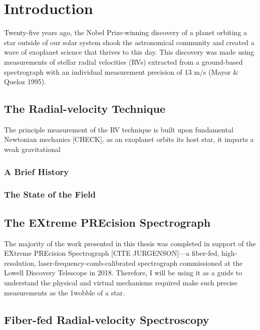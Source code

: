 \chapter{Introduction} \label{intro}

Twenty-five years ago, the Nobel Prize-winning discovery of a planet orbiting a star outside of our solar system shook the astronomical community and created a wave of exoplanet science that thrives to this day. This discovery was made using measurements of stellar radial velocities (RVs) extracted from a ground-based spectrograph with an individual measurement precision of 13 m/s (Mayor \& Queloz 1995). 


\section{The Radial-velocity Technique} \label{intro:eprv}

The principle measurement of the RV technique is built upon fundamental Newtonian mechanics [CHECK].  as an exoplanet orbits its host star, it imparts a weak gravitational



\subsection{A Brief History}

\subsection{The State of the Field}



\section{The EXtreme PREcision Spectrograph} \label{intro:expres}

The majority of the work presented in this thesis was completed in support of the EXtreme PREcision Spectrograph [CITE JURGENSON]---a fiber-fed, high-resolution, laser-frequency-comb-calibrated spectrograph commissioned at the Lowell Discovery Telescope in 2018. Therefore, I will be using it as a guide to understand the physical and virtual mechanisms required make such precise measurements as the 1\ms wobble of a star.

\section{Fiber-fed Radial-velocity Spectroscopy} \label{intro:optics}

